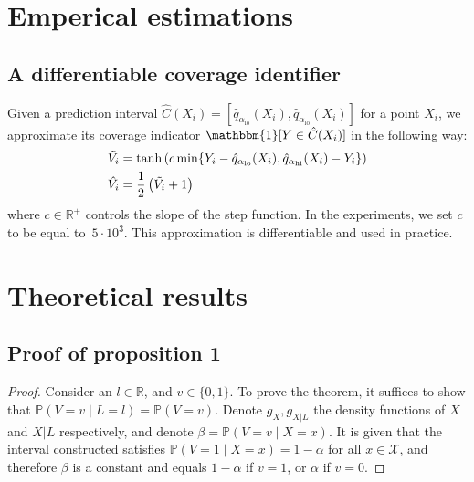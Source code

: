 \documentclass{article}
\begin{document}


\clearpage
\begin{appendices}



\section{Emperical estimations}

\subsection{A differentiable coverage identifier}\label{V_estimation}

Given a prediction interval $\hat{C}(X_i)=[\hat{q}_{\alpha_{\textrm{lo}}}(X_i), \hat{q}_{\alpha_{\textrm{lo}}}(X_i)]$ for a point $X_i$, we approximate its coverage indicator $\mathbbm{1}[Y \in \hat{C}(X_i)]$ in the following way:
\begin{equation}
\begin{split}
& \Tilde{V_i} = \tanh\left(c \min\{Y_i -  \hat{q}_{\alpha_{\textrm{lo}}}(X_i), \hat{q}_{\alpha_{\textrm{hi}}}(X_i) - Y_i\}\right) \\
& \hat{V_i} = \frac{1}{2} \left( \Tilde{V_i} + 1 \right)
\end{split}
\end{equation}
where $c \in \mathbb{R}^+$ controls the slope of the step function. In the experiments, we set $c$ to be equal to~$5\cdot {10}^3$. This approximation is differentiable and used in practice.


\section{Theoretical results}\label{proofs}


\subsection{Proof of proposition 1}\label{th1_proof}

\begin{proof}
Consider an $l \in \mathbb{R}$, and $v\in \{0,1\}$. To prove the theorem, it suffices to show that $\mathbb{P}(V=v \mid L=l) = \mathbb{P}(V=v)$. 
Denote $g_X, g_{X|L}$ the density functions of $X$ and  $X|L$ respectively, and denote $\beta = \mathbb{P}(V=v \mid X=x)$. It is given that the interval constructed satisfies $\mathbb{P}(V=1 \mid X=x)=1-\alpha$ for all $x \in \mathcal{X}$, and therefore $\beta$ is a constant and equals $1-\alpha$ if $v=1$, or $\alpha$ if $v=0$.


\end{proof}
\end{appendices}
\end{document}
